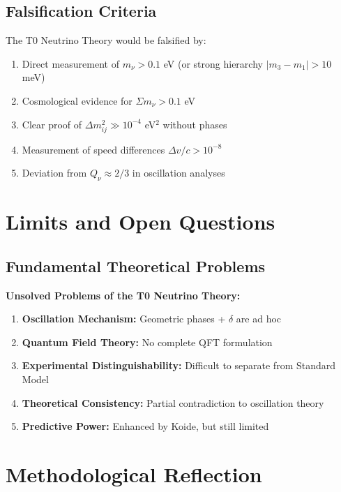 	\subsection{Falsification Criteria}
	
	The T0 Neutrino Theory would be falsified by:
	\begin{enumerate}
		\item Direct measurement of $m_\nu > 0.1$ eV (or strong hierarchy $|m_3 - m_1| > 10$ meV)
		\item Cosmological evidence for $\Sigma m_\nu > 0.1$ eV
		\item Clear proof of $\Delta m^2_{ij} \gg 10^{-4}$ eV$^2$ without phases
		\item Measurement of speed differences $\Delta v/c > 10^{-8}$
		\item Deviation from $Q_\nu \approx 2/3$ in oscillation analyses
	\end{enumerate}
	
	\section{Limits and Open Questions}
	
	\subsection{Fundamental Theoretical Problems}
	
	\begin{warning}
		\textbf{Unsolved Problems of the T0 Neutrino Theory:}
		
		\begin{enumerate}
			\item \textbf{Oscillation Mechanism:} Geometric phases + $\delta$ are ad hoc
			\item \textbf{Quantum Field Theory:} No complete QFT formulation
			\item \textbf{Experimental Distinguishability:} Difficult to separate from Standard Model
			\item \textbf{Theoretical Consistency:} Partial contradiction to oscillation theory
			\item \textbf{Predictive Power:} Enhanced by Koide, but still limited
		\end{enumerate}
	\end{warning}
	
	\section{Methodological Reflection}
	
